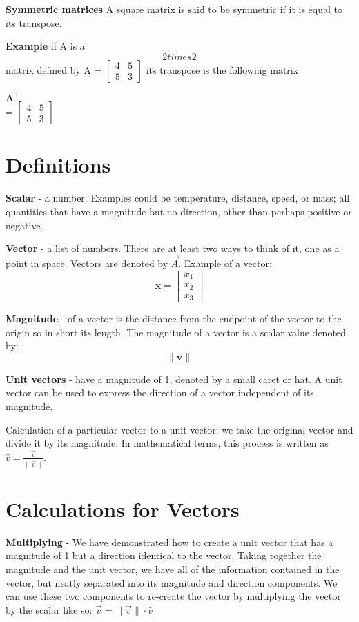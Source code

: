 \documentclass{article}
\begin{document}
\textbf {Symmetric matrices}
 A square matrix is said to be symmetric if it is equal to its transpose. 

\textbf {Example}
if A is a \[
  2 times 2
\] 
matrix defined by
A = $\begin{bmatrix}
  4 & 5 \\
  5 & 3
\end{bmatrix}$
its transpose is the following matrix

$\mathbf{A}^\intercal$\\= $\begin{bmatrix}
  4 & 5 \\
  5 & 3
\end{bmatrix}$
\section{Definitions}
\textbf{Scalar} - a number. Examples could be temperature, distance, speed, or mass; all quantities that have a magnitude but no direction, other than perhaps positive or negative.

\textbf{Vector} - a list of numbers. There are at least two ways to think of it, one as a point in space. Vectors are denoted by $\vec{A}$.
Example of a vector:
\begin{equation}
  \mathbf{x}= \begin{bmatrix} x_{1} \\ x_{2} \\ x_{3} \end{bmatrix}
  \label{vectorLatex}
\end{equation}

\textbf{Magnitude} - of a vector is the distance from the endpoint of the vector to the origin so in short its length. The magnitude of a vector is a scalar value denoted by:
\[
  \| \mathbf{v} \|
\]

\textbf{Unit vectors} - have a magnitude of 1, denoted by a small caret or hat. A unit vector can be used to express the direction of a vector independent of its magnitude.

Calculation of a particular vector to a unit vector: we take the original vector and divide it by its magnitude. In mathematical terms, this process is written as $\hat{v} = \frac{\vec{v}}{\|\vec{v}\|}$.

\section{Calculations for Vectors}
\textbf{Multiplying} - We have demonstrated how to create a unit vector that has a magnitude of 1 but a direction identical to the vector. Taking together the magnitude and the unit vector, we have all of the information contained in the vector, but neatly separated into its magnitude and direction components. We can use these two components to re-create the vector by multiplying the vector by the scalar like so: $\vec{v} = \|\vec{v}\| \cdot \hat{v}$
\end{document}
